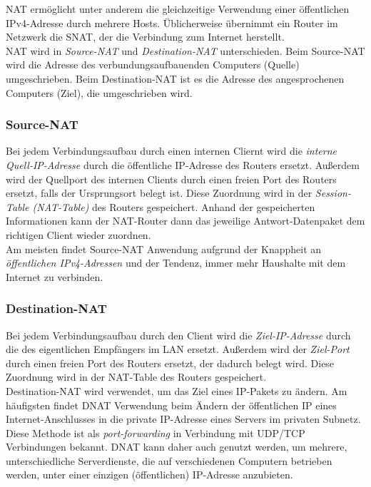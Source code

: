 \documentclass[a4paper, 12pt]{report}
\begin{document}
NAT ermöglicht unter anderem die gleichzeitige Verwendung einer öffentlichen
IPv4-Adresse durch mehrere Hosts. Üblicherweise übernimmt ein Router im Netzwerk
die SNAT, der die Verbindung zum Internet herstellt. \\

NAT wird in \emph{Source-NAT} und \emph{Destination-NAT} unterschieden. Beim
Source-NAT wird die Adresse des verbundungsaufbauenden Computers (Quelle)
umgeschrieben. Beim Destination-NAT ist es die Adresse des angesprochenen
Computers (Ziel), die umgeschrieben wird.

\subsubsection{Source-NAT}

Bei jedem Verbindungsaufbau durch einen internen Cliernt wird die \emph{interne
Quell-IP-Adresse} durch die öffentliche IP-Adresse des Routers ersetzt. Außerdem
wird der Quellport des internen Clients durch einen freien Port des Routers
ersetzt, falls der Ursprungsort belegt ist. Diese Zuordnung wird in der
\emph{Session-Table (NAT-Table)} des Routers gespeichert. Anhand der
gespeicherten Informationen kann der NAT-Router dann das jeweilige
Antwort-Datenpaket dem richtigen Client wieder zuordnen. \\

Am meisten findet Source-NAT Anwendung aufgrund der Knappheit an
\emph{öffentlichen IPv4-Adressen} und der Tendenz, immer mehr Haushalte mit dem
Internet zu verbinden.

\subsubsection{Destination-NAT}

Bei jedem Verbindungsaufbau durch den Client wird die \emph{Ziel-IP-Adresse}
durch die des eigentlichen Empfängers im LAN ersetzt. Außerdem wird der
\emph{Ziel-Port} durch einen freien Port des Routers ersetzt, der dadurch
belegt wird. Diese Zuordnung wird in der NAT-Table des Routers gespeichert. \\

Destination-NAT wird verwendet, um das Ziel eines IP-Pakets zu ändern. Am
häufigsten findet DNAT Verwendung beim Ändern der öffentlichen IP eines
Internet-Anschlusses in die private IP-Adresse eines Servers im privaten
Subnetz. Diese Methode ist als \emph{port-forwarding} in Verbindung mit UDP/TCP
Verbindungen bekannt. DNAT kann daher auch genutzt werden, um mehrere,
unterschiedliche Serverdienste, die auf verschiedenen Computern betrieben
werden, unter einer einzigen (öffentlichen) IP-Adresse anzubieten.
\end{document}
